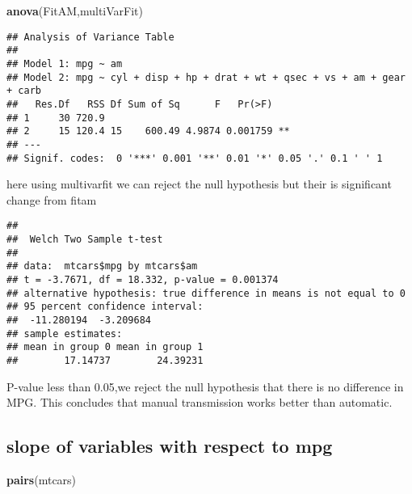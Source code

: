 \documentclass[
]{article}
\newenvironment{Shaded}{\begin{snugshade}}{\end{snugshade}}
\newcommand{\KeywordTok}[1]{\textcolor[rgb]{0.13,0.29,0.53}{\textbf{#1}}}
\newcommand{\NormalTok}[1]{#1}
\newcommand{\OperatorTok}[1]{\textcolor[rgb]{0.81,0.36,0.00}{\textbf{#1}}}
\begin{document}
\begin{Shaded}
\begin{Highlighting}[]
\KeywordTok{anova}\NormalTok{(FitAM,multiVarFit)}
\end{Highlighting}
\end{Shaded}

\begin{verbatim}
## Analysis of Variance Table
## 
## Model 1: mpg ~ am
## Model 2: mpg ~ cyl + disp + hp + drat + wt + qsec + vs + am + gear + carb
##   Res.Df   RSS Df Sum of Sq      F   Pr(>F)   
## 1     30 720.9                                
## 2     15 120.4 15    600.49 4.9874 0.001759 **
## ---
## Signif. codes:  0 '***' 0.001 '**' 0.01 '*' 0.05 '.' 0.1 ' ' 1
\end{verbatim}

here using multivarfit we can reject the null hypothesis but their is
significant change from fitam

\begin{Shaded}
\end{Shaded}

\begin{verbatim}
## 
##  Welch Two Sample t-test
## 
## data:  mtcars$mpg by mtcars$am
## t = -3.7671, df = 18.332, p-value = 0.001374
## alternative hypothesis: true difference in means is not equal to 0
## 95 percent confidence interval:
##  -11.280194  -3.209684
## sample estimates:
## mean in group 0 mean in group 1 
##        17.14737        24.39231
\end{verbatim}

P-value less than 0.05,we reject the null hypothesis that there is no
difference in MPG. This concludes that manual transmission works better
than automatic.

\hypertarget{slope-of-variables-with-respect-to-mpg}{%
\subsection{slope of variables with respect to
mpg}\label{slope-of-variables-with-respect-to-mpg}}

\begin{Shaded}
\begin{Highlighting}[]
\KeywordTok{pairs}\NormalTok{(mtcars)}
\end{Highlighting}
\end{Shaded}
\end{document}
